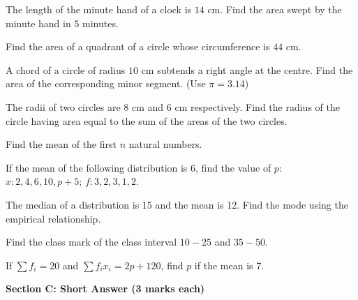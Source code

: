 \documentclass[12pt,a4paper]{exam}
\begin{document}
\begin{questions}
\question[2] The length of the minute hand of a clock is $14 \text{ cm}$. Find the area swept by the minute hand in $5$ minutes.
\vspace{0.15cm}

\question[2] Find the area of a quadrant of a circle whose circumference is $44 \text{ cm}$.
\vspace{0.15cm}

\question[2] A chord of a circle of radius $10 \text{ cm}$ subtends a right angle at the centre. Find the area of the corresponding minor segment. (Use $\pi = 3.14$)
\vspace{0.15cm}

\question[2] The radii of two circles are $8 \text{ cm}$ and $6 \text{ cm}$ respectively. Find the radius of the circle having area equal to the sum of the areas of the two circles.
\vspace{0.15cm}

\question[2] Find the mean of the first $n$ natural numbers.
\vspace{0.15cm}

\question[2] If the mean of the following distribution is 6, find the value of $p$: $x: 2, 4, 6, 10, p+5$; $f: 3, 2, 3, 1, 2$.
\vspace{0.15cm}

\question[2] The median of a distribution is 15 and the mean is 12. Find the mode using the empirical relationship.
\vspace{0.15cm}

\question[2] Find the class mark of the class interval $10-25$ and $35-50$.
\vspace{0.15cm}

\question[2] If $\sum f_i = 20$ and $\sum f_i x_i = 2p + 120$, find $p$ if the mean is 7.
\vspace{0.15cm}

\end{questions}
\bigskip
\noindent\textbf{\large Section C: Short Answer (3 marks each)}
\end{document}
